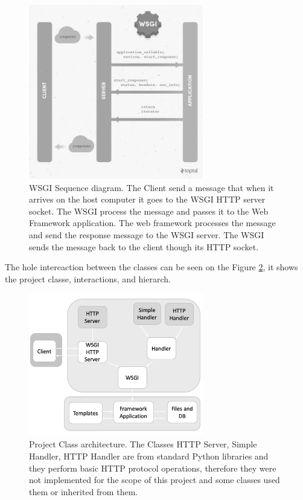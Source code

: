 \documentclass[journal,12pt,onecolumn,draftclsnofoot,]{IEEEtran}
\begin{document}
\begin{figure}
  \begin{center}
  \includegraphics[width=3.0in]{./imgs/wsgi.jpg}
  \caption{WSGI Sequence diagram. The Client send a message that when it arrives on the host computer it goes to the WSGI HTTP server socket. The WSGI process the message and passes it to the Web Framework application. The web framework processes the message and send the response message to the WSGI server. The WSGI sends the message back to the client though its HTTP socket.}
  \label{fig_wsgi}
  \end{center}
\end{figure}

The hole intereaction between the classes can be seen on the Figure \ref{fig_project}, it shows the project classe, interactions, and hierarch.

\begin{figure}
  \begin{center}
  \includegraphics[width=3.0in]{./imgs/project.png}
  \caption{Project Class architecture. The Classes HTTP Server, Simple Handler, HTTP Handler are from standard Python libraries and they perform basic HTTP protocol operations, therefore they were not implemented for the scope of this project and some classes used them or inherited from them.}
  \label{fig_project}
  \end{center}
\end{figure}
\end{document}
